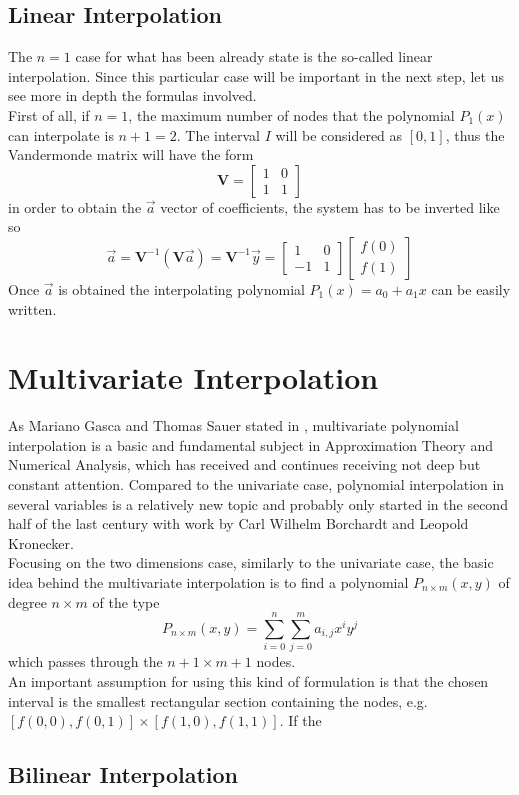 \subsection{Linear Interpolation}
The $n=1$ case for what has been already state is the so-called linear interpolation. Since this particular case will be important in the next step, let us see more in depth the formulas involved.\\
First of all, if $n=1$, the maximum number of nodes that the polynomial $P_1(x)$ can interpolate is $n+1=2$. The interval $I$ will be considered as $\left[ 0,1\right] $, thus the Vandermonde matrix will have the form
\[
\textbf{V} = 
\begin{bmatrix}
1 & 0  \\
1 & 1
\end{bmatrix}
\]
in order to obtain the $\vec{a}$ vector of coefficients, the system has to be inverted like so
\[
\vec{a} = \textbf{V}^{-1}\left( \textbf{V}\vec{a}\right)  = \textbf{V}^{-1}\vec{y} = 
\begin{bmatrix}
1 & 0  \\
-1 & 1
\end{bmatrix}
\begin{bmatrix}
f(0)  \\
f(1)
\end{bmatrix}
\]
Once $\vec{a}$ is obtained the interpolating polynomial $P_1(x) = a_0 + a_1x$ can be easily written.
%
\section{Multivariate Interpolation}
As Mariano Gasca and Thomas Sauer stated in \cite{Gasca}, multivariate polynomial interpolation is a basic and fundamental subject in Approximation Theory and Numerical Analysis, which has received and continues receiving not deep but constant attention. Compared to the univariate case, polynomial interpolation in several variables is a relatively new topic and probably only started in the second half of the last century with work by Carl Wilhelm Borchardt and Leopold Kronecker.\\
Focusing on the two dimensions case, similarly to the univariate case, the basic idea behind the multivariate interpolation is to find a polynomial $P_{n \times m}(x,y)$ of degree $n \times m$ of the type 
\[
P_{n \times m}(x,y) = \sum_{i=0}^{n}\sum_{j=0}^{m} a_{i,j}x^i y^j
\]
which passes through the $n+1 \times m+1$ nodes.\\
An important assumption for using this kind of formulation is that the chosen interval is the smallest rectangular section containing the nodes, e.g. $\left[f(0,0),f(0,1)\right]\times\left[f(1,0),f(1,1)\right]$.
If the 
\subsection{Bilinear Interpolation}


